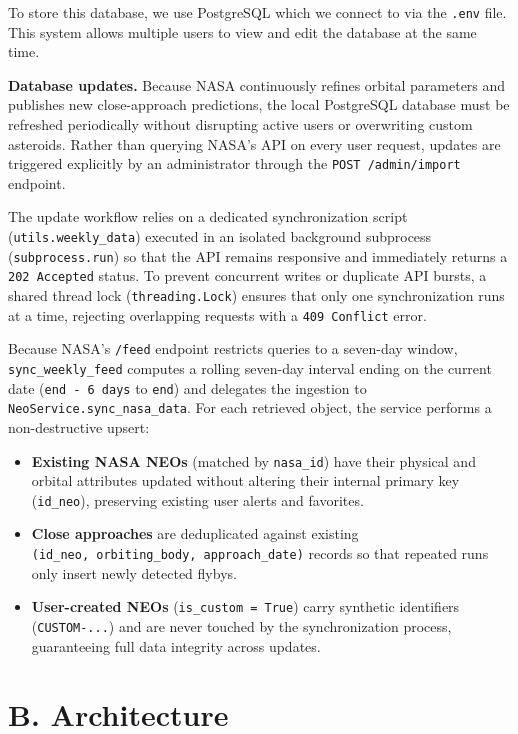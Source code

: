 \documentclass[
  french,
  11pt,
  a4paper,
]{report}
\providecommand{\tightlist}{%
  \setlength{\itemsep}{0pt}\setlength{\parskip}{0pt}}
\begin{document}
To store this database, we use PostgreSQL which we connect to via the
\texttt{.env} file. This system allows multiple users to view and edit
the database at the same time.

\textbf{Database updates.} Because NASA continuously refines orbital
parameters and publishes new close-approach predictions, the local
PostgreSQL database must be refreshed periodically without disrupting
active users or overwriting custom asteroids. Rather than querying
NASA's API on every user request, updates are triggered explicitly by an
administrator through the \texttt{POST\ /admin/import} endpoint.

The update workflow relies on a dedicated synchronization script
(\texttt{utils.weekly\_data}) executed in an isolated background
subprocess (\texttt{subprocess.run}) so that the API remains responsive
and immediately returns a \texttt{202\ Accepted} status. To prevent
concurrent writes or duplicate API bursts, a shared thread lock
(\texttt{threading.Lock}) ensures that only one synchronization runs at
a time, rejecting overlapping requests with a \texttt{409\ Conflict}
error.

Because NASA's \texttt{/feed} endpoint restricts queries to a seven-day
window, \texttt{sync\_weekly\_feed} computes a rolling seven-day
interval ending on the current date (\texttt{end\ -\ 6\ days} to
\texttt{end}) and delegates the ingestion to
\texttt{NeoService.sync\_nasa\_data}. For each retrieved object, the
service performs a non-destructive upsert:

\begin{itemize}
\tightlist
\item
  \textbf{Existing NASA NEOs} (matched by \texttt{nasa\_id}) have their
  physical and orbital attributes updated without altering their
  internal primary key (\texttt{id\_neo}), preserving existing user
  alerts and favorites.
\item
  \textbf{Close approaches} are deduplicated against existing
  \texttt{(id\_neo,\ orbiting\_body,\ approach\_date)} records so that
  repeated runs only insert newly detected flybys.
\item
  \textbf{User-created NEOs} (\texttt{is\_custom\ =\ True}) carry
  synthetic identifiers (\texttt{CUSTOM-...}) and are never touched by
  the synchronization process, guaranteeing full data integrity across
  updates.
\end{itemize}

\section{B. Architecture}\label{b.-architecture}
\end{document}
